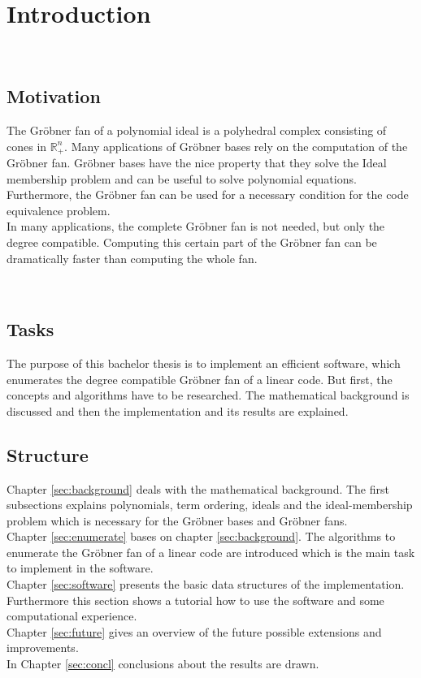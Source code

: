 \section{Introduction}

~\\
\subsection{Motivation}
The Gröbner fan of a polynomial ideal is a polyhedral complex consisting of cones in $\mathbb{R}_{+}^{n}$.
Many applications of Gröbner bases rely on the computation of the Gröbner fan.
Gröbner bases have the nice property that they solve the Ideal membership problem and can be useful to solve polynomial equations.
Furthermore, the Gröbner fan can be used for a necessary condition for the code equivalence problem. \\
In many applications, the complete Gröbner fan is not needed, but only the degree compatible. 
Computing this certain part of the Gröbner fan can be dramatically faster than computing the whole fan.

~\\

\subsection{Tasks}
The purpose of this bachelor thesis is to implement an efficient software, which enumerates the degree compatible Gröbner fan of a linear code. But first, the concepts and algorithms have to be researched. The mathematical background is discussed and then the implementation and its results are explained. 

\newpage

\subsection{Structure}
Chapter \ref{sec:background} deals with the mathematical background. The first subsections explains polynomials, term ordering, ideals and the ideal-membership problem which is necessary for the Gröbner bases and Gröbner fans. \\
Chapter \ref{sec:enumerate} bases on chapter \ref{sec:background}. The algorithms to enumerate the Gröbner fan of a linear code are introduced which is the main task to implement in the software.\\
Chapter \ref{sec:software} presents the basic data structures of the implementation. Furthermore this section shows a tutorial how to use the software and some computational experience.\\
Chapter \ref{sec:future} gives an overview of the future possible extensions and improvements.\\
In Chapter \ref{sec:concl} conclusions about the results are drawn.
\newpage